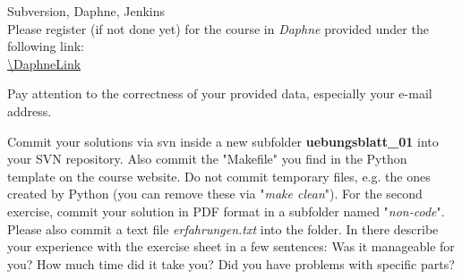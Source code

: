  Subversion, Daphne, Jenkins \\
Please register (if not done yet) for the course in \textit{Daphne} provided under the following
link:\\
\url{\DaphneLink}

Pay attention to the correctness of your provided data, especially your e-mail
address.

Commit your solutions via svn inside a new subfolder
\textbf{uebungsblatt\_01} into your SVN repository. Also commit the "Makefile" you find in the Python template on the course website. Do not commit temporary files, e.g. the ones created by Python (you can remove these via "\textit{make clean}").
For the second exercise, commit your solution in PDF format in a subfolder named "\textit{non-code}".
Please also commit a text file \textit{erfahrungen.txt} into the folder. In there describe your experience with the exercise sheet in a few sentences:
Was it manageable for you?
How much time did it take you?
Did you have problems with specific parts?
